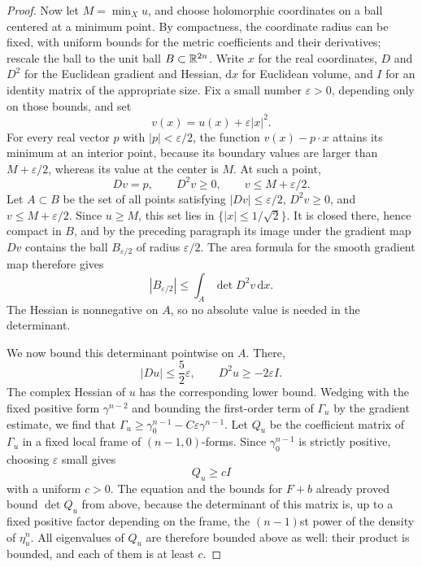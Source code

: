 \begin{proof}
Now let $M=\min_Xu$, and choose holomorphic coordinates on a ball centered at a minimum point. By compactness, the coordinate radius can be fixed, with uniform bounds for the metric coefficients and their derivatives; rescale the ball to the unit ball $B\subset\mathbb R^{2n}$. Write $x$ for the real coordinates, $D$ and $D^2$ for the Euclidean gradient and Hessian, $\mathrm{d}x$ for Euclidean volume, and $I$ for an identity matrix of the appropriate size. Fix a small number $\varepsilon>0$, depending only on those bounds, and set
\[
 v(x)=u(x)+\varepsilon|x|^2.
\]
For every real vector $p$ with $|p|<\varepsilon/2$, the function $v(x)-p\cdot x$ attains its minimum at an interior point, because its boundary values are larger than $M+\varepsilon/2$, whereas its value at the center is $M$. At such a point,
\[
 Dv=p,\qquad D^2v\geq0,\qquad
 v\leq M+\varepsilon/2.
\]
Let $A\subset B$ be the set of all points satisfying
$|Dv|\leq\varepsilon/2$, $D^2v\geq0$, and $v\leq M+\varepsilon/2$.
Since $u\geq M$, this set lies in $\{|x|\leq1/\sqrt2\}$. It is closed there, hence compact in $B$, and by the preceding paragraph its image under the gradient map $Dv$ contains the ball $B_{\varepsilon/2}$ of radius $\varepsilon/2$. The area formula for the smooth gradient map therefore gives
\begin{equation}\label{eq:stw-contact-area}
 |B_{\varepsilon/2}|
       \leq\int_A\det D^2v\,\mathrm{d}x.
\end{equation}
The Hessian is nonnegative on $A$, so no absolute value is needed in the determinant.

We now bound this determinant pointwise on $A$. There,
\[
 |Du|\leq\frac52\varepsilon,
 \qquad D^2u\geq-2\varepsilon I.
\]
The complex Hessian of $u$ has the corresponding lower bound. Wedging with the fixed positive form $\gamma^{n-2}$ and bounding the first-order term of $\Gamma_u$ by the gradient estimate, we find that $\Gamma_u\geq\gamma_0^{n-1}-C\varepsilon\gamma^{n-1}$. Let $Q_u$ be the coefficient matrix of $\Gamma_u$ in a fixed local frame of $(n-1,0)$-forms. Since $\gamma_0^{n-1}$ is strictly positive, choosing $\varepsilon$ small gives
\[
 Q_u\geq cI
\]
with a uniform $c>0$. The equation and the bounds for $F+b$ already proved bound $\det Q_u$ from above, because the determinant of this matrix is, up to a fixed positive factor depending on the frame, the $(n-1)$st power of the density of $\eta_u^n$. All eigenvalues of $Q_u$ are therefore bounded above as well: their product is bounded, and each of them is at least $c$.


\end{proof}
